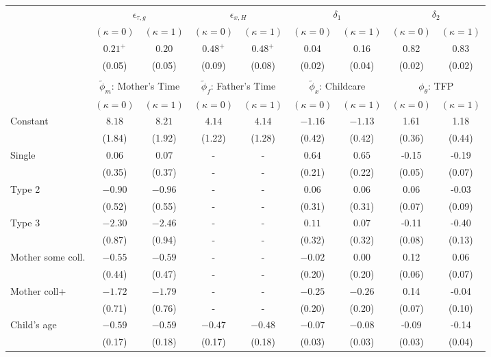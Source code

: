 \begin{tabular}{lcccccccc}\\\toprule
 & \multicolumn{2}{c}{$\epsilon_{\tau,g}$} & \multicolumn{2}{c}{$\epsilon_{x,H}$} & \multicolumn{2}{c}{$\delta_{1}$} & \multicolumn{2}{c}{$\delta_{2}$} \\
& $(\kappa=0)$ & $(\kappa=1)$ & $(\kappa=0)$ & $(\kappa=1)$ & $(\kappa=0)$ & $(\kappa=1)$ & $(\kappa=0)$ & $(\kappa=1)$ \\\cmidrule(r){2-3}\cmidrule(r){4-5}\cmidrule(r){6-7}\cmidrule(r){8-9}
&$0.21^{+}$&$0.20$&$0.48^{+}$&$0.48^{+}$&0.04&0.16&0.82&0.83\\
&(0.05)&(0.05)&(0.09)&(0.08)&(0.02)&(0.04)&(0.02)&(0.02)\\
&&&&&&&&\\
 & \multicolumn{2}{c}{$\tilde{\phi}_{m}$: Mother's Time} & \multicolumn{2}{c}{$\tilde{\phi}_{f}$: Father's Time} & \multicolumn{2}{c}{$\tilde{\phi}_{x}$: Childcare} & \multicolumn{2}{c}{$\phi_{\theta}$: TFP} \\
& $(\kappa=0)$ & $(\kappa=1)$ & $(\kappa=0)$ & $(\kappa=1)$ & $(\kappa=0)$ & $(\kappa=1)$ & $(\kappa=0)$ & $(\kappa=1)$ \\\cmidrule(r){2-3}\cmidrule(r){4-5}\cmidrule(r){6-7}\cmidrule(r){8-9}
Constant&$8.18$&$8.21$&$4.14$&$4.14$&$-1.16$&$-1.13$&1.61&1.18\\
&(1.84)&(1.92)&(1.22)&(1.28)&(0.42)&(0.42)&(0.36)&(0.44)\\
Single&$0.06$&$0.07$&-&-&$0.64$&$0.65$&-0.15&-0.19\\
&(0.35)&(0.37)&-&-&(0.21)&(0.22)&(0.05)&(0.07)\\
Type 2&$-0.90$&$-0.96$&-&-&$0.06$&$0.06$&0.06&-0.03\\
&(0.52)&(0.55)&-&-&(0.31)&(0.31)&(0.07)&(0.09)\\
Type 3&$-2.30$&$-2.46$&-&-&$0.11$&$0.07$&-0.11&-0.40\\
&(0.87)&(0.94)&-&-&(0.32)&(0.32)&(0.08)&(0.13)\\
Mother some coll.&$-0.55$&$-0.59$&-&-&$-0.02$&$0.00$&0.12&0.06\\
&(0.44)&(0.47)&-&-&(0.20)&(0.20)&(0.06)&(0.07)\\
Mother coll+&$-1.72$&$-1.79$&-&-&$-0.25$&$-0.26$&0.14&-0.04\\
&(0.71)&(0.76)&-&-&(0.20)&(0.20)&(0.07)&(0.10)\\
Child's age&$-0.59$&$-0.59$&$-0.47$&$-0.48$&$-0.07$&$-0.08$&-0.09&-0.14\\
&(0.17)&(0.18)&(0.17)&(0.18)&(0.03)&(0.03)&(0.03)&(0.04)\\

\end{tabular}
